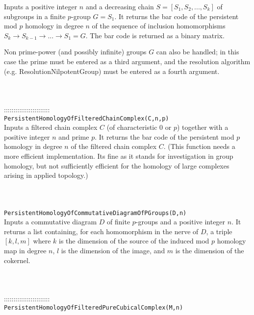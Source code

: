 \documentclass[a4paper,11pt]{report}
\begin{document}
{ Inputs a positive integer $n$ and a decreasing chain $S=[S_1, S_2, ..., S_k]$ of subgroups in a finite $p$-group $G=S_1$. It returns the bar code of the persistent mod $p$ homology in degree $n$ of the sequence of inclusion homomorphisms $S_k \rightarrow S_{k-1} \rightarrow ... \rightarrow S_1=G $. The bar code is returned as a binary matrix. 

 Non prime-power (and possibly infinite) groups $G$ can also be handled; in this case the prime must be entered as a third
argument, and the resolution algorithm (e.g. ResolutionNilpotentGroup) must be
entered as a fourth argument. \\
 \\
 \\
 \\
 ::::::::::::::::::::::::\\
 \texttt{PersistentHomologyOfFilteredChainComplex(C,n,p) }\\
 

 Inputs a filtered chain complex $C$ (of characteristic $0$ or $p$) together with a positive integer $n$ and prime $p$. It returns the bar code of the persistent mod $p$ homology in degree $n$ of the filtered chain complex $C$. (This function needs a more efficient implementation. Its fine as it stands
for investigation in group homology, but not sufficiently efficient for the
homology of large complexes arising in applied topology.) \\
 \\
 \\
 \\
 \texttt{PersistentHomologyOfCommutativeDiagramOfPGroups(D,n) }\\
 

 Inputs a commutative diagram $D$ of finite $p$-groups and a positive integer $n$. It returns a list containing, for each homomorphism in the nerve of $D$, a triple $[k,l,m]$ where $k$ is the dimension of the source of the induced mod $p$ homology map in degree $n$, $l$ is the dimension of the image, and $m$ is the dimension of the cokernel. \\
 \\
 \\
 \\
 ::::::::::::::::::::::::\\
 \texttt{PersistentHomologyOfFilteredPureCubicalComplex(M,n)}\\
 

}
\end{document}
